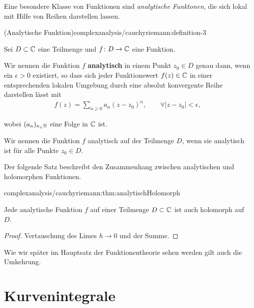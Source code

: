 \par
Eine besondere Klasse von Funktionen sind \emph{analytische Funktonen}, die sich lokal mit Hilfe von Reihen darstellen lassen.
\begin{definition}{(Analytische Funktion)}{complexanalysis/cauchyriemann:definition-3}



\par
Sei \(D \subset \mathbb{C}\) eine Teilmenge und \(f \colon D \rightarrow \mathbb{C}\) eine Funktion.

\par
Wir nennen die Funktion \(f\) \textbf{analytisch} in einem Punkt \(z_0 \in D\) genau dann, wenn ein \(\epsilon > 0\) existiert, so dass sich jeder Funktionswert \(f(z) \in \mathbb{C}\) in einer entsprechenden lokalen Umgebung durch eine absolut konvergente Reihe darstellen lässt mit
\begin{align*}
f(z) = \sum_{n \geq 0} a_n (z-z_0)^n, \qquad \forall |z - z_0| < \epsilon,
\end{align*}
\par
wobei \((a_n)_{n_\in\mathbb{N}}\) eine Folge in \(\mathbb{C}\) ist.

\par
Wir nennen die Funktion \(f\) analytisch auf der Teilmenge \(D\), wenn sie analytisch ist für alle Punkte \(z_0 \in D\).
\end{definition}

\par
Der folgende Satz beschreibt den Zusammenhang zwischen analytischen und holomorphen Funktionen.
\begin{theorem}{}{complexanalysis/cauchyriemann:thm:analytischHolomorph}



\par
Jede analytische Funktion \(f\) auf einer Teilmenge \(D \subset \mathbb{C}\) ist auch holomorph auf \(D\).
\end{theorem}

\begin{proof}
 Vertauschung des Limes \(h \rightarrow 0\) und der Summe.
\end{proof}

\par
Wie wir später im Hauptsatz der Funktionentheorie sehen werden gilt auch die Umkehrung.


\section{Kurvenintegrale}
\label{\detokenize{complexanalysis/kurvenintegrale:kurvenintegrale}}\label{\detokenize{complexanalysis/kurvenintegrale::doc}}

